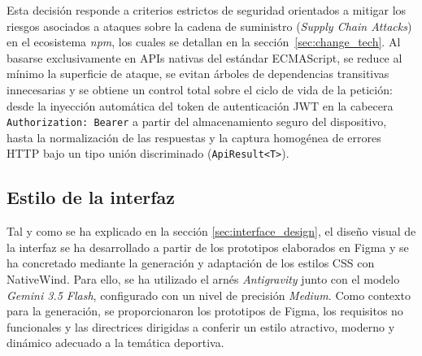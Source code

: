 Esta decisión responde a criterios estrictos de seguridad orientados a mitigar los riesgos asociados a ataques sobre la cadena de suministro (\textit{Supply Chain Attacks}) en el ecosistema \textit{npm}, los cuales se detallan en la sección~\ref{sec:change_tech}. Al basarse exclusivamente en APIs nativas del estándar ECMAScript, se reduce al mínimo la superficie de ataque, se evitan árboles de dependencias transitivas innecesarias y se obtiene un control total sobre el ciclo de vida de la petición: desde la inyección automática del token de autenticación JWT en la cabecera \texttt{Authorization: Bearer} a partir del almacenamiento seguro del dispositivo, hasta la normalización de las respuestas y la captura homogénea de errores HTTP bajo un tipo unión discriminado (\texttt{ApiResult<T>}).

\subsection{Estilo de la interfaz}
Tal y como se ha explicado en la sección \ref{sec:interface_design}, el diseño visual de la interfaz se ha desarrollado a partir de los prototipos elaborados en Figma y se ha concretado mediante la generación y adaptación de los estilos CSS con NativeWind. Para ello, se ha utilizado el arnés \emph{Antigravity} junto con el modelo \emph{Gemini 3.5 Flash}, configurado con un nivel de precisión \emph{Medium}. Como contexto para la generación, se proporcionaron los prototipos de Figma, los requisitos no funcionales y las directrices dirigidas a conferir un estilo atractivo, moderno y dinámico adecuado a la temática deportiva.

